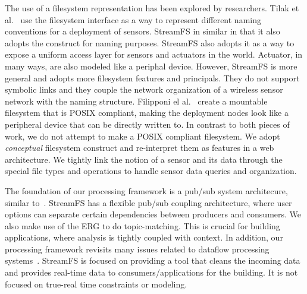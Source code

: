 The use of a filesystem representation has been explored by researchers.  Tilak et al.~\cite{BingFS} use the filesystem 
interface as a way to represent different naming conventions for a deployment of sensors.	StreamFS in similar in that it also 
adopts the construct for naming purposes.  StreamFS also adopts it as a way to expose a uniform access layer for sensors and
actuators in the world.  Actuator, in many ways, are also modeled like a periphal device.
However, StreamFS is more general and adopts more filesystem features and principals.
They do not support symbolic links and they couple the network organization of a wireless sensor network with the naming structure.
Filipponi el al.~\cite{wsnfuse} create a mountable filesystem that is POSIX compliant, making the deployment nodes
look like a peripheral device that can be directly written to.  In contrast to both pieces of work, we do not attempt
to make a POSIX compliant filesystem.  We adopt \emph{conceptual} filesystem construct and re-interpret them as features in 
a web architecture.  We tightly link the notion of a sensor and its data through the special file types and operations to 
handle sensor data queries and organization.




The foundation of our processing framework is a pub/sub system architecure, similar 
to~\cite{Eugster01contentbasedpubsub, Rosenblum97adesign, tspaces, tibco}.  StreamFS has a flexible pub/sub coupling architecture,
where user options can separate certain dependencies between producers and consumers.  We also make use of the ERG to 
do topic-matching.  This is crucial for building applications, where analysis is tightly coupled with context.
In addition, our processing framework revisits many issues related to dataflow processing systems~\cite{CullerCSD92716,ptolemy2001,ptolemy2007}.
StreamFS is focused on providing a tool that cleans the incoming data and provides real-time data to consumers/applications
for the building.  It is not focused on true-real time constraints or modeling.


